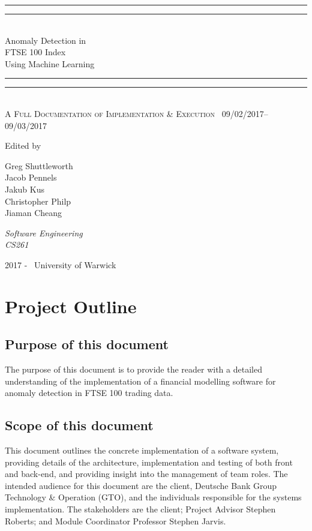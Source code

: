 \documentclass[11pt]{report}
\newlength{\drop}
\begin{document}
  \begin{titlepage}
    \textheight
    \centering
    \vspace*{\baselineskip}
    \rule{\textwidth}{1.6pt}\vspace*{-\baselineskip}\vspace*{2pt}
    \rule{\textwidth}{0.4pt}\\[\baselineskip]
    {\LARGE Anomaly Detection in \\ FTSE 100 Index \\[0.3\baselineskip] Using Machine Learning}\\[0.2\baselineskip]
    \rule{\textwidth}{0.4pt}\vspace*{-\baselineskip}\vspace{3.2pt}
    \rule{\textwidth}{1.6pt}\\[\baselineskip]
    \scshape
    A Full Documentation of Implementation \& Execution \ 09/02/2017--09/03/2017\par
    \vspace*{2\baselineskip}
    Edited by \\[\baselineskip]
    {\Large Greg Shuttleworth \\ Jacob Pennels \\ Jakub Kus \\ Christopher Philp \\ Jiaman Cheang \\[\baselineskip]\par}
    {\itshape Software Engineering \\ CS261\par}
    \vfill
    {\scshape 2017 -} \        {\large University of Warwick}\par
  \end{titlepage}

\setlength{\voffset}{-0.75in}
\setlength{\headsep}{50pt}

\section{Project Outline} 
\subsection{Purpose of this document}
{The purpose of this document is to provide the reader with a detailed understanding of the implementation of a financial
modelling software for anomaly detection in FTSE 100 trading data.} 
\subsection{Scope of this document}
{This document outlines the concrete implementation of a software system, providing details of the architecture,
implementation and testing of both front and back-end, and providing insight into the management of team roles. The intended 
audience for this document are the client, Deutsche Bank Group Technology \& Operation (GTO), and the individuals responsible
for the systems implementation. The stakeholders are the client; Project Advisor Stephen Roberts; and Module Coordinator
Professor Stephen Jarvis.\\}
\end{document}
